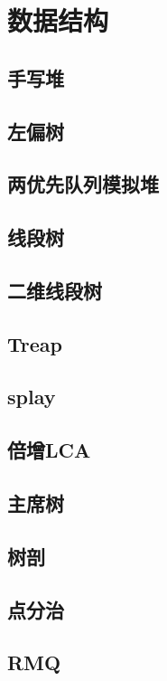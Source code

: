 \documentclass[main.tex]{subfiles}
\begin{document}
\chapter{数据结构}
\section{手写堆}
    
\section{左偏树}
    
\section{两优先队列模拟堆}
    
\section{线段树}
    
\section{二维线段树}
    
\section{Treap}
    
\section{splay}
    
\section{倍增LCA}
    
\section{主席树}
    
\section{树剖}
    
\section{点分治}
    
\section{RMQ}
    
\end{document}
